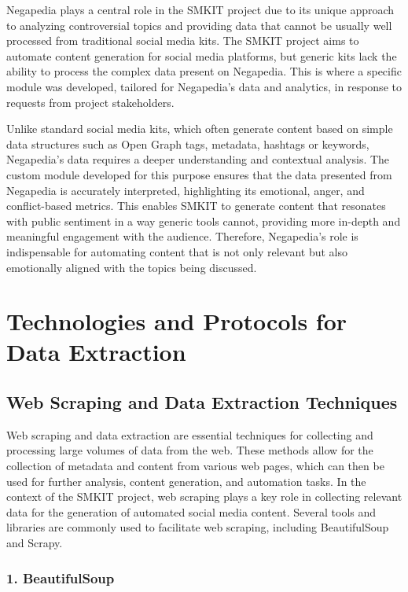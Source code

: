 Negapedia plays a central role in the SMKIT project due to its unique approach to analyzing controversial topics and providing data that cannot be usually well processed from traditional social media kits. The SMKIT project aims to automate content generation for social media platforms, but generic kits lack the ability to process the complex data present on Negapedia. This is where a specific module was developed, tailored for Negapedia’s data and analytics, in response to requests from project stakeholders.

Unlike standard social media kits, which often generate content based on simple data structures such as Open Graph tags, metadata, hashtags or keywords, Negapedia’s data requires a deeper understanding and contextual analysis. The custom module developed for this purpose ensures that the data presented from Negapedia is accurately interpreted, highlighting its emotional, anger, and conflict-based metrics. This enables SMKIT to generate content that resonates with public sentiment in a way generic tools cannot, providing more in-depth and meaningful engagement with the audience. Therefore, Negapedia’s role is indispensable for automating content that is not only relevant but also emotionally aligned with the topics being discussed.


\section{Technologies and Protocols for Data Extraction}
\label{sec:technologies_and_protocols_for_data_extraction}

\subsection{Web Scraping and Data Extraction Techniques}
\label{subsec:web_scraping_and_data_extraction_techniques}

Web scraping and data extraction are essential techniques for collecting and processing large volumes of data from the web. These methods allow for the collection of metadata and content from various web pages, which can then be used for further analysis, content generation, and automation tasks. In the context of the SMKIT project, web scraping plays a key role in collecting relevant data for the generation of automated social media content. Several tools and libraries are commonly used to facilitate web scraping, including BeautifulSoup and Scrapy.

\subsubsection{1. BeautifulSoup}

